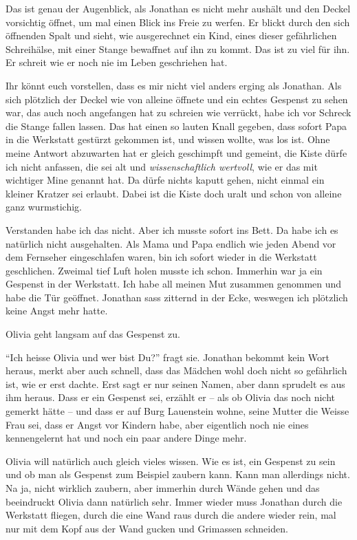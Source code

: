 Das ist genau der Augenblick, als Jonathan es nicht mehr aushält und den Deckel
vorsichtig öffnet, um mal einen Blick ins Freie zu werfen. Er blickt durch den
sich öffnenden Spalt und sieht, wie ausgerechnet ein Kind, eines dieser gefährlichen Schreihälse, mit einer Stange bewaffnet auf ihn zu kommt. Das ist zu viel für ihn. Er schreit wie er noch nie im Leben geschriehen hat.

\begin{mdframed}[style=mystyle]
  Ihr könnt euch vorstellen, dass es mir nicht viel anders erging als Jonathan.
  Als sich plötzlich der Deckel wie von alleine öffnete und ein echtes Gespenst zu sehen war, das auch noch angefangen hat zu schreien wie verrückt, habe ich vor Schreck die Stange fallen lassen. Das hat einen so lauten Knall gegeben, dass sofort Papa in die Werkstatt gestürzt gekommen ist, und wissen wollte, was los ist. Ohne meine Antwort abzuwarten hat er gleich geschimpft und gemeint, die Kiste dürfe ich nicht anfassen, die sei alt und \emph{wissenschaftlich wertvoll}, wie er das mit wichtiger Mine genannt hat. Da dürfe nichts kaputt gehen, nicht einmal ein kleiner Kratzer sei erlaubt. Dabei ist die Kiste doch uralt und schon von alleine ganz wurmstichig. 
  
Verstanden habe ich das nicht. Aber ich musste sofort ins Bett. Da habe ich es natürlich nicht ausgehalten. Als Mama und Papa endlich wie jeden Abend vor dem Fernseher eingeschlafen waren, bin ich sofort wieder in die Werkstatt geschlichen. Zweimal tief Luft holen musste ich schon. Immerhin war ja ein Gespenst in der Werkstatt. Ich habe all meinen Mut zusammen genommen und habe die Tür geöffnet. Jonathan sass zitternd in der Ecke, weswegen ich plötzlich keine Angst mehr hatte. 
\end{mdframed}

Olivia geht langsam auf das Gespenst zu. 

\enquote{Ich heisse Olivia und wer bist Du?} fragt sie. Jonathan bekommt kein Wort heraus, merkt aber auch schnell, dass das Mädchen wohl doch nicht so gefährlich ist, wie er erst dachte. Erst sagt er nur seinen Namen, aber dann sprudelt es aus ihm heraus. Dass er ein Gespenst sei, erzählt er -- als ob Olivia das noch nicht gemerkt hätte -- und dass er auf Burg Lauenstein wohne, seine Mutter die Weisse Frau sei, dass er Angst vor Kindern habe, aber eigentlich noch nie eines kennengelernt hat und noch ein paar andere Dinge mehr. 

Olivia will natürlich auch gleich vieles wissen. Wie es ist, ein Gespenst zu sein und ob man als Gespenst zum Beispiel zaubern kann. Kann man allerdings nicht. Na ja, nicht wirklich zaubern, aber immerhin durch Wände gehen und das beeindruckt Olivia dann natürlich sehr. Immer wieder muss Jonathan durch die Werkstatt fliegen, durch die eine Wand raus durch die andere wieder rein, mal nur mit dem Kopf aus der Wand gucken und Grimassen schneiden. 


